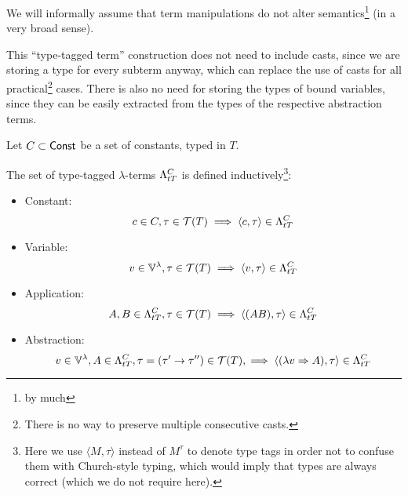 \documentclass[main.tex]{subfiles}
\begin{document}

We will informally assume that term manipulations do not alter semantics\footnote{
    by much} (in a very broad sense).

This ``type-tagged term'' construction  does not need to include casts, since we are storing
a type for every subterm anyway, which can replace the use of casts for all
practical\footnote{
    There is no way to preserve multiple consecutive casts.
} cases. There is also no need for storing the types of bound variables, since
they can be easily extracted from the types of the respective abstraction terms.
\begin{defn}
    Let $C \subset \const$ be a set of constants, typed in $T$.

    The set of type-tagged $\lambda$-terms $\ttlambda{T}{C}$ is defined inductively\footnote{
        Here we use $\langle M, \tau \rangle$ instead of $M^\tau$
        to denote type tags in order not to confuse them with Church-style
        typing, which would imply that types are always correct (which we
        do not require here).
    }:
    \begin{itemize}
        \item Constant:
            \[ c \in C, \tau \in \tclos{T} \implies \ttt{c}{\tau} \in \ttlambda{T}{C} \]
        \item Variable:
            \[ v \in \lvars, \tau \in \tclos{T} \implies \ttt{v}{\tau} \in \ttlambda{T}{C} \]
        \item Application:
            \[ A, B \in \ttlambda{T}{C}, \tau \in \tclos{T} \implies \ttt{(AB)}{\tau} \in \ttlambda{T}{C} \]
        \item Abstraction:
            \[ v \in \lvars, A \in \ttlambda{T}{C},
                \tau = (\tau' \tot \tau'') \in \tclos{T},
                \implies \ttt{(\lambda v \abstr A)}{\tau} \in \ttlambda{T}{C} \]
    \end{itemize}
\end{defn}
\end{document}
